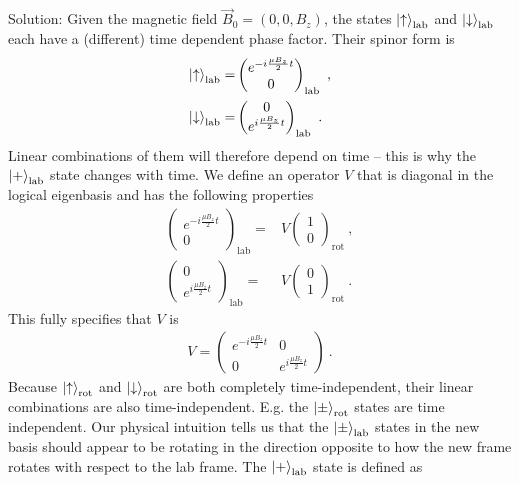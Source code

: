 \documentclass{../lab}
\begin{document}
\begin{enumerate}
\begin{enumerate}
			Solution: Given the magnetic field $\vec{B}_0 = (0,0,B_z)$, the states $\ket{\uparrow}_\text{lab}$ and $\ket{\downarrow}_\text{lab}$ each have a (different) time dependent phase factor. Their spinor form is
\begin{align*}
	\ket{\uparrow}_\text{lab} =& 
	\begin{pmatrix}
		 e^{-i \frac{\mu B_z}{2}t}\\
		 0
	\end{pmatrix}_\text{lab}~,	
	\\
	\ket{\downarrow}_\text{lab} =& 
	\begin{pmatrix}
		0 \\
		 e^{i \frac{\mu B_z}{2}t}
	\end{pmatrix}_\text{lab}~.	
\end{align*}
Linear combinations of them will therefore depend on time -- this is why the $\ket{+}_\text{lab}$ state changes with time. We define an operator $V$ that is diagonal in the logical eigenbasis and has the following properties
\begin{align*}
	\begin{pmatrix}
		 e^{-i \frac{\mu B_z}{2}t}\\
		 0
	\end{pmatrix}_\text{lab}
	=& V 
	\begin{pmatrix}
		 1\\
		 0
	\end{pmatrix}_\text{rot}~, \\
	\begin{pmatrix}
		0 \\
		 e^{i \frac{\mu B_z}{2}t}
	\end{pmatrix}_\text{lab}
	=& V 
	\begin{pmatrix}
		 0\\
		 1
	\end{pmatrix}_\text{rot}~.
\end{align*}
This fully specifies that $V$ is
\begin{align*}
	V = 
	\begin{pmatrix}
		e^{-i \frac{\mu B_z}{2}t} & 0 \\
		0 & e^{i \frac{\mu B_z}{2}t}
	\end{pmatrix}~.
\end{align*}
Because $\ket{\uparrow}_\text{rot}$ and $\ket{\downarrow}_\text{rot}$ are both completely time-independent, their linear combinations are also time-independent. E.g. the $\ket{\pm}_\text{rot}$ states are time independent. Our physical intuition tells us that the $\ket{\pm}_\text{lab}$ states in the new basis should appear to be rotating in the direction opposite to how the new frame rotates with respect to the lab frame. The $\ket{+}_\text{lab}$ state is defined as

\end{enumerate}
\end{enumerate}
\end{document}
